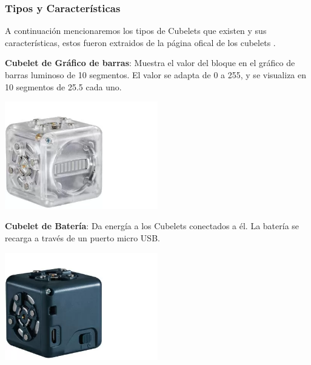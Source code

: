 \subsubsection{Tipos y Caracter\'isticas}
\label{ssub:tiposYCaractCubelets}
    A continuaci\'on mencionaremos los tipos de Cubelets que existen y sus caracter\'isticas, estos fueron extraidos de la p\'agina ofical de los
        cubelets \cite{modrobotics2023}.
    \begin{itemize}
        \begin{minipage}
            {0.5\textwidth}
            \item \textbf{Cubelet de Gr\'afico de barras}: Muestra el valor del bloque en el gr\'afico
                de barras luminoso de 10 segmentos. El valor se adapta de 0 a 255, y se visualiza en 10 
                segmentos de 25.5 cada uno.
        \end{minipage}
        \begin{minipage}
            {0.5\textwidth}
            \centering
            \includegraphics[width=0.5\textwidth]{./images/marco_teorico/cubelets/graficoDeBarras.png}
        \end{minipage}
        \begin{minipage}
            {0.5\textwidth}
            \item \textbf{Cubelet de Bater\'ia}: Da energ\'ia a los Cubelets conectados a \'el. 
                La bater\'ia se recarga a trav\'es de un puerto micro USB.
        \end{minipage}
        \begin{minipage}
            {0.5\textwidth}
            \centering
            \includegraphics[width=0.5\textwidth]{./images/marco_teorico/cubelets/bateria.png}

\end{minipage}
\end{itemize}
